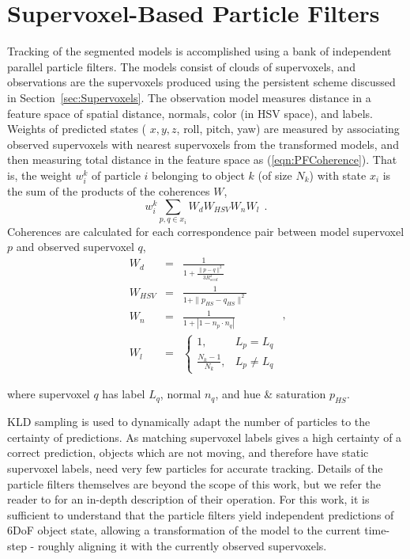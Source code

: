 \section{Supervoxel-Based Particle Filters}
Tracking of the segmented models is accomplished using a bank of independent parallel particle filters. The models consist of clouds of supervoxels, and observations are the supervoxels produced using the persistent scheme discussed in Section~\ref{sec:Supervoxels}. The observation model measures distance in a feature space of spatial distance, normals, color (in HSV space), and labels. Weights of predicted states ( $x,y,z$, roll, pitch, yaw) are measured by associating observed supervoxels with nearest supervoxels from the transformed models, and then measuring total distance in the feature space as (\ref{eqn:PFCoherence}). That is, the weight $w^k_i$ of particle $i$ belonging to object $k$ (of size $N_k$) with state $x_i$ is the sum of the products of the coherences $W$,
\begin{equation}
\label{eqn:PFCoherence}
w^k_{i} \sum_{p,q \in x_i} W_d W_{HSV} W_n W_l ~~.
\end{equation}
Coherences are calculated for each correspondence pair between model supervoxel $p$ and observed supervoxel $q$,
\begin{equation}
\label{eqn:DistTerms}
 \begin{array}{lcl}
 W_d & = & \frac{1}{1 + \frac{ \| p - q \|^2}{3 {R}_{seed}^{2}}} \\
 W_{HSV} & = & \frac{1}{1 + \|p_{HS}-q_{HS}\|^2} \\
 W_n & = & \frac{1}{ 1 + \left| 1 - n_p \cdot n_q \right| } \\
 W_l & = & \begin{cases} 1, & L_p = L_q \\ 
                         \frac{N_k-1}{N_k}, & L_p \neq L_q 
           \end{cases} 
 \end{array} ,
\end{equation}

where supervoxel $q$ has label $L_q$, normal $n_q$, and hue \& saturation $p_{HS}$.

KLD sampling \cite{KLDParticleFilter} is used to dynamically adapt the number of particles to the certainty of predictions. As matching supervoxel labels gives a high certainty of a correct prediction, objects which are not moving, and therefore have static supervoxel labels, need very few particles for accurate tracking. Details of the particle filters themselves are beyond the scope of this work, but we refer the reader to \cite{KLDParticleFilter} for an in-depth description of their operation. For this work, it is sufficient to understand that the particle filters yield independent predictions of 6DoF object state, allowing a transformation of the model to the current time-step - roughly aligning it with the currently observed supervoxels.  

